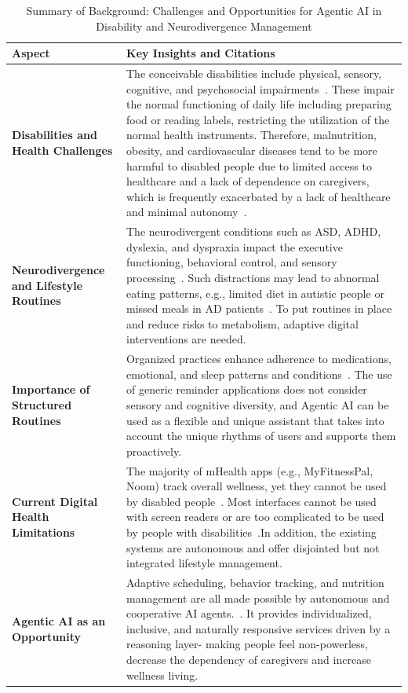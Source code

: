 \documentclass[pdflatex,sn-mathphys-num]{sn-jnl}
\begin{document}
\begin{table}[htbp]
	\centering
	\caption{Summary of Background: Challenges and Opportunities for Agentic AI in Disability and Neurodivergence Management}
	\label{tab:background}
	\renewcommand{\arraystretch}{1.5} %
	\begin{tabular}{p{3cm} p{10cm}}
		\hline
		\textbf{Aspect} & \textbf{Key Insights and Citations} \\
		\hline
		\textbf{Disabilities and Health Challenges} & 
		The conceivable disabilities include physical, sensory, cognitive, and psychosocial impairments~\cite{WHO2020,Emerson2019}. These impair the normal functioning of daily life including preparing food or reading labels, restricting the utilization of the normal health instruments. Therefore, malnutrition, obesity, and cardiovascular diseases tend to be more harmful to disabled people due to limited access to healthcare and a lack of dependence on caregivers, which is frequently exacerbated by a lack of healthcare and minimal autonomy~\cite{krahn2015}. \\[0.5em]
		
		\textbf{Neurodivergence and Lifestyle Routines} & 
		The neurodivergent conditions such as ASD, ADHD, dyslexia, and dyspraxia impact the executive functioning, behavioral control, and sensory processing~\cite{Kapp2020}. Such distractions may lead to abnormal eating patterns, e.g., limited diet in autistic people or missed meals in AD patients~\cite{faraone2021}. To put routines in place and reduce risks to metabolism, adaptive digital interventions are needed. \\[0.5em]
		
		\textbf{Importance of Structured Routines} & 
		Organized practices enhance adherence to medications, emotional, and sleep patterns and conditions~\cite{SonugaBarke2021}. The use of generic reminder applications does not consider sensory and cognitive diversity, and Agentic AI can be used as a flexible and unique assistant that takes into account the unique rhythms of users and supports them proactively. \\[0.5em]
		
		\textbf{Current Digital Health Limitations} & 
		The majority of mHealth apps (e.g., MyFitnessPal, Noom) track overall wellness, yet they cannot be used by disabled people~\cite{Chen2019}. Most interfaces cannot be used with screen readers or are too complicated to be used by people with disabilities~\cite{Milton2018}.In addition, the existing systems are autonomous and offer disjointed but not integrated lifestyle management. \\[0.5em]
		
		\textbf{Agentic AI as an Opportunity} & 
		Adaptive scheduling, behavior tracking, and nutrition management are all made possible by autonomous and cooperative AI agents.~\cite{Lemke2022,Choudhury2023}. It provides individualized, inclusive, and naturally responsive services driven by a reasoning layer- making people feel non-powerless, decrease the dependency of caregivers and increase wellness living. \\
		\hline
	\end{tabular}
\end{table}
\end{document}
